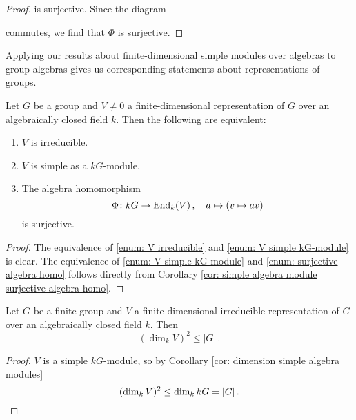\begin{proof}
  is surjective.
  Since the diagram
  \begin{center}
  \end{center}
  commutes, we find that $\Phi$ is surjective.
\end{proof}


Applying our results about finite-dimensional simple modules over algebras to group algebras gives us corresponding statements about representations of groups.


\begin{lem}\label{lem: equivalence to irreducible}
  Let $G$ be a group and $V \neq 0$ a finite-dimensional representation of $G$ over an algebraically closed field $k$. Then the following are equivalent:
  \begin{enumerate}[label=\emph{\roman*)},leftmargin=*]
    \item \label{enum: V irreducible}
      $V$ is irreducible.
    \item \label{enum: V simple kG-module}
      $V$ is simple as a $kG$-module.
    \item \label{enum: surjective algebra homo}
      The algebra homomorphism
      \[
                \Phi
        \colon  kG
        \to     \operatorname{End}_k(V) \,,
        \quad   a
        \mapsto (v \mapsto av)
      \]
      is surjective.
  \end{enumerate}
\end{lem}
\begin{proof}
  The equivalence of \ref{enum: V irreducible} and \ref{enum: V simple kG-module} is clear.
  The equivalence of \ref{enum: V simple kG-module} and \ref{enum: surjective algebra homo} follows directly from Corollary \ref{cor: simple algebra module surjective algebra homo}.
\end{proof}


\begin{cor}
  Let $G$ be a finite group and $V$ a finite-dimensional irreducible representation of $G$ over an algebraically closed field $k$.
  Then
  \[
          \left( \dim_k V \right)^2
    \leq |G| \,.
  \]
\end{cor}
\begin{proof}
  $V$ is a simple $kG$-module, so by Corollary \ref{cor: dimension simple algebra modules}
  \[
          (\dim_k V)^2
    \leq  \dim_k kG
    =     |G| \,.
    \qedhere
  \]
\end{proof}


